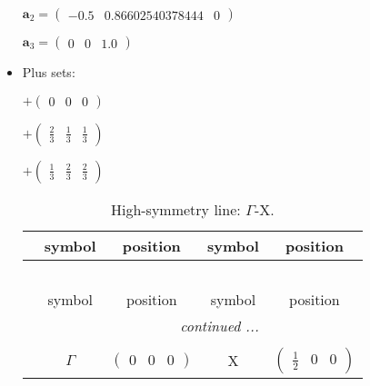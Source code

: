 \documentclass[fleqn,10pt,landscape]{article}
\begin{document}
\begin{itemize}
\quad $\bm{a}_2=\begin{pmatrix} -0.5 & 0.86602540378444 & 0 \end{pmatrix}$

\quad $\bm{a}_3=\begin{pmatrix} 0 & 0 & 1.0 \end{pmatrix}$

\item Plus sets:

\quad $+\begin{pmatrix} 0 & 0 & 0 \end{pmatrix}$

\quad $+\begin{pmatrix} \frac{2}{3} & \frac{1}{3} & \frac{1}{3} \end{pmatrix}$

\quad $+\begin{pmatrix} \frac{1}{3} & \frac{2}{3} & \frac{2}{3} \end{pmatrix}$

\begin{center}
\renewcommand{\arraystretch}{1.3}
\begin{longtable}{c|cc|cc}
\caption{High-symmetry line: $\Gamma$-X.}
 \\
 \hline \hline
 & symbol & position & symbol & position \\ \hline \endfirsthead

\multicolumn{4}{l}{\tablename\ \thetable{}} \\
 \hline \hline
 & symbol & position & symbol & position \\ \hline \endhead

 \hline \hline
\multicolumn{4}{r}{\footnotesize\it continued ...} \\ \endfoot

 \hline \hline
\multicolumn{4}{r}{} \\ \endlastfoot

 & $\Gamma$ & $\begin{pmatrix} 0 & 0 & 0 \end{pmatrix}$ & X & $\begin{pmatrix} \frac{1}{2} & 0 & 0 \end{pmatrix}$ \\
\end{longtable}
\end{center}


\end{itemize}
\end{document}
